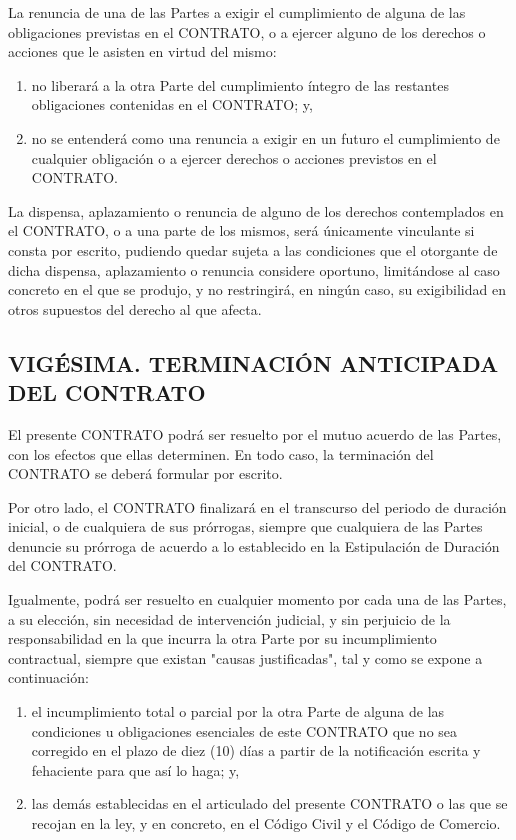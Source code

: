 \documentclass[a4paper,11pt]{report}
\begin{document}
	La renuncia de una de las Partes a exigir el cumplimiento de alguna de
	las obligaciones previstas en el CONTRATO, o a ejercer alguno de los
	derechos o acciones que le asisten en virtud del mismo:
		\begin{enumerate}[label=\Alph*)]
			\item no liberará a la otra Parte del cumplimiento íntegro de las
			restantes obligaciones contenidas en el CONTRATO; y,

			\item no se entenderá como una renuncia a
			exigir en un futuro el cumplimiento de cualquier obligación o a ejercer
			derechos o acciones previstos en el CONTRATO.
		\end{enumerate}

	La dispensa, aplazamiento o renuncia de alguno de los derechos
	contemplados en el CONTRATO, o a una parte de los mismos, será
	únicamente vinculante si consta por escrito, pudiendo quedar sujeta a
	las condiciones que el otorgante de dicha dispensa, aplazamiento o
	renuncia considere oportuno, limitándose al caso concreto en el que se
	produjo, y no restringirá, en ningún caso, su exigibilidad en otros
	supuestos del derecho al que afecta.

	\subsection*{VIGÉSIMA. TERMINACIÓN ANTICIPADA DEL CONTRATO}

	El presente CONTRATO podrá ser resuelto por el mutuo acuerdo de las
	Partes, con los efectos que ellas determinen. En todo caso, la
	terminación del CONTRATO se deberá formular por escrito.

	Por otro lado, el CONTRATO finalizará en el transcurso del periodo de
	duración inicial, o de cualquiera de sus prórrogas, siempre que
	cualquiera de las Partes denuncie su prórroga de acuerdo a lo
	establecido en la Estipulación de Duración del CONTRATO.

	Igualmente, podrá ser resuelto en cualquier momento por cada una de las
	Partes, a su elección, sin necesidad de intervención judicial, y sin
	perjuicio de la responsabilidad en la que incurra la otra Parte por su
	incumplimiento contractual, siempre que existan "causas justificadas",
	tal y como se expone a continuación:

	\begin{enumerate}[label=\Alph*)]
		\item el incumplimiento total o parcial por la otra Parte de alguna de las
		condiciones u obligaciones esenciales de este CONTRATO que no sea
		corregido en el plazo de diez (10) días a partir de la notificación
		escrita y fehaciente para que así lo haga; y,

		\item las demás establecidas en el articulado del presente CONTRATO o las
		que se recojan en la ley, y en concreto, en el Código Civil y el Código
		de Comercio.
	\end{enumerate}
\end{document}

